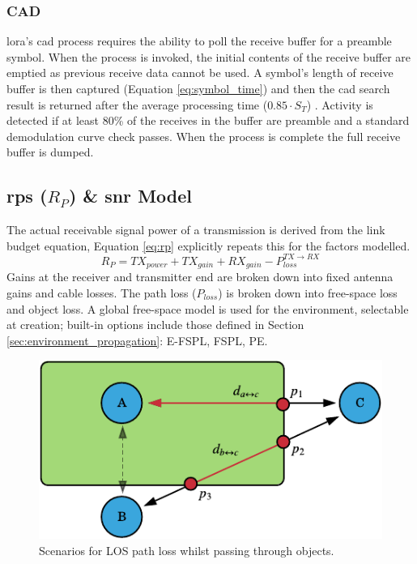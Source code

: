\subsubsection{CAD}
\ac{lora}'s \ac{cad} process requires the ability to poll the receive buffer for a preamble symbol. When the process is invoked, the initial contents of the receive buffer are emptied as previous receive data cannot be used. A symbol's length of receive buffer is then captured (Equation \ref{eq:symbol_time}) and then the \ac{cad} search result is returned after the average processing time ($0.85\cdot S_T$) \cite{3YP:LORA_SX12}. Activity is detected if at least 80\% of the receives in the buffer are preamble and a standard demodulation curve check passes. When the process is complete the full receive buffer is dumped.

\subsection{\ac{rps} ($R_P$) \& \ac{snr} Model}
The actual receivable signal power of a transmission is derived from the link budget equation, Equation \ref{eq:rp} explicitly repeats this for the factors modelled.
\begin{equation}
\label{eq:rp}
	R_P = TX_{power} + TX_{gain} + RX_{gain} - P_{loss}^{TX\rightarrow RX}
\end{equation}
Gains at the receiver and transmitter end are broken down into fixed antenna gains and cable losses. The path loss ($P_{loss}$) is broken down into free-space loss and object loss. A global free-space model is used for the environment, selectable at creation; built-in options include those defined in Section \ref{sec:environment_propagation}: E-FSPL, FSPL, PE. 

\begin{figure}[H]
    \centering
   	\includegraphics{Figures/obstacle_diagram}
    \caption[Object path loss scenarios]{
    	Scenarios for LOS path loss whilst passing through objects.   
    }
    \label{fig:object_path_loss}
\end{figure}

